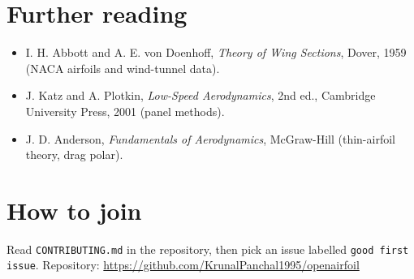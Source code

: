 \documentclass[11pt,a4paper]{article}
\begin{document}
\section{Further reading}
\begin{itemize}[nosep]
\item I. H. Abbott and A. E. von Doenhoff, \emph{Theory of Wing Sections}, Dover, 1959 (NACA airfoils and wind-tunnel data).
\item J. Katz and A. Plotkin, \emph{Low-Speed Aerodynamics}, 2nd ed., Cambridge University Press, 2001 (panel methods).
\item J. D. Anderson, \emph{Fundamentals of Aerodynamics}, McGraw-Hill (thin-airfoil theory, drag polar).
\end{itemize}

\section{How to join}
Read \texttt{CONTRIBUTING.md} in the repository, then pick an issue labelled \texttt{good first issue}. Repository: \url{https://github.com/KrunalPanchal1995/openairfoil}
\end{document}
